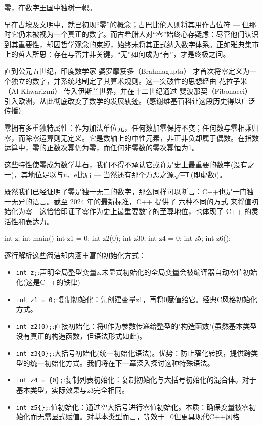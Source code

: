 
零，在数字王国中独树一帜。

早在古埃及文明中，就已初现“零”的概念；古巴比伦人则将其用作占位符 --- 但那时它仍未被视为一个真正的数字。而古希腊人对“零”始终心存疑虑：尽管他们认识到其重要性，却因哲学观念的束缚，始终未将其正式纳入数字体系。正如雅典集市上的哲人所思：存在与否并非关键，“无”如何成为“有”，才是终极之问。

直到公元五世纪，印度数学家 婆罗摩笈多（Brahmagupta） 才首次将零定义为一个独立的数字，并系统地制定了其算术规则。这一突破性的思想经由 花拉子米（Al-Khwarizmi） 传入伊斯兰世界，并在十二世纪通过 斐波那契（Fibonacci） 引入欧洲，从此彻底改变了数学的发展轨迹。（感谢维基百科让这段历史得以广泛传播）

零拥有多重独特属性：作为加法单位元，任何数加零保持不变；任何数与零相乘归零，而除零运算则无定义。它是数轴上的中性元素，非正非负却属于偶数。在指数运算中，零的正数次幂仍为零，而任何非零数的零次幂恒为1。

这些特性使零成为数学基石，我们不得不承认它或许是史上最重要的数字(没有之一)，其地位足以与π、e比肩 --- 当然还有那个万恶之源$\sqrt{-1}$(即虚数i)。

既然我们已经证明了零是独一无二的数字，那么同样可以断言：C++也是一门独一无异的语言。截至 2024 年的最新标准，C++ 提供了 六种不同的方式 来将值初始化为零---这恰恰印证了零作为史上最重要数字的至尊地位，也体现了 C++ 的灵活性和表达力。

\begin{cpp}
int z;
int main()
{
  int z1 = 0;
  int z2(0);
  int z3{0};
  int z4 = {0};
  int z5{};
  int z6();
}
\end{cpp}

逐行解析这些简洁却内涵丰富的初始化方式：

\begin{itemize}
\item 
\verb|int z;|:声明全局整型变量z,未显式初始化的全局变量会被编译器自动零值初始化(这是C++的铁律)

\item 
\verb|int z1 = 0;|:复制初始化：先创建变量z1，再将0赋值给它。经典C风格初始化方式。

\item 
\verb|int z2(0);|:直接初始化：将0作为参数传递给整型的"构造函数"(虽然基本类型没有真正的构造函数，但语法形式如此)。

\item 
\verb|int z3{0};|:大括号初始化(统一初始化语法)。优势：防止窄化转换，提供跨类型的统一初始化方式。我们将在下一章深入探讨这种特殊语法。

\item 
\verb|int z4 = {0};|:复制列表初始化：复制初始化与大括号初始化的混合体。对于基本类型，实际效果与z3完全相同。

\item 
\verb|int z5{};|:值初始化：通过空大括号{}进行零值初始化。本质：确保变量被零初始化而无需显式赋值。对基本类型而言，等效于=0但更具现代C++风格
\end{itemize}

